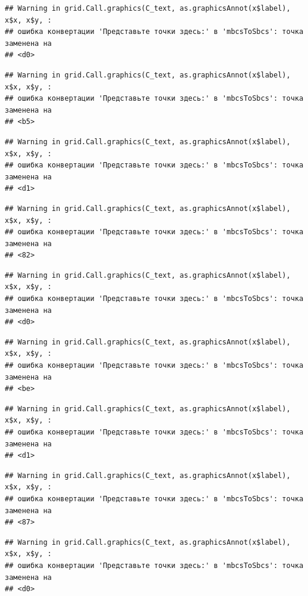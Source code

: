 \documentclass[]{book}
\begin{document}
\begin{verbatim}
## Warning in grid.Call.graphics(C_text, as.graphicsAnnot(x$label), x$x, x$y, :
## ошибка конвертации 'Представьте точки здесь:' в 'mbcsToSbcs': точка заменена на
## <d0>
\end{verbatim}

\begin{verbatim}
## Warning in grid.Call.graphics(C_text, as.graphicsAnnot(x$label), x$x, x$y, :
## ошибка конвертации 'Представьте точки здесь:' в 'mbcsToSbcs': точка заменена на
## <b5>
\end{verbatim}

\begin{verbatim}
## Warning in grid.Call.graphics(C_text, as.graphicsAnnot(x$label), x$x, x$y, :
## ошибка конвертации 'Представьте точки здесь:' в 'mbcsToSbcs': точка заменена на
## <d1>
\end{verbatim}

\begin{verbatim}
## Warning in grid.Call.graphics(C_text, as.graphicsAnnot(x$label), x$x, x$y, :
## ошибка конвертации 'Представьте точки здесь:' в 'mbcsToSbcs': точка заменена на
## <82>
\end{verbatim}

\begin{verbatim}
## Warning in grid.Call.graphics(C_text, as.graphicsAnnot(x$label), x$x, x$y, :
## ошибка конвертации 'Представьте точки здесь:' в 'mbcsToSbcs': точка заменена на
## <d0>
\end{verbatim}

\begin{verbatim}
## Warning in grid.Call.graphics(C_text, as.graphicsAnnot(x$label), x$x, x$y, :
## ошибка конвертации 'Представьте точки здесь:' в 'mbcsToSbcs': точка заменена на
## <be>
\end{verbatim}

\begin{verbatim}
## Warning in grid.Call.graphics(C_text, as.graphicsAnnot(x$label), x$x, x$y, :
## ошибка конвертации 'Представьте точки здесь:' в 'mbcsToSbcs': точка заменена на
## <d1>
\end{verbatim}

\begin{verbatim}
## Warning in grid.Call.graphics(C_text, as.graphicsAnnot(x$label), x$x, x$y, :
## ошибка конвертации 'Представьте точки здесь:' в 'mbcsToSbcs': точка заменена на
## <87>
\end{verbatim}

\begin{verbatim}
## Warning in grid.Call.graphics(C_text, as.graphicsAnnot(x$label), x$x, x$y, :
## ошибка конвертации 'Представьте точки здесь:' в 'mbcsToSbcs': точка заменена на
## <d0>
\end{verbatim}
\end{document}
